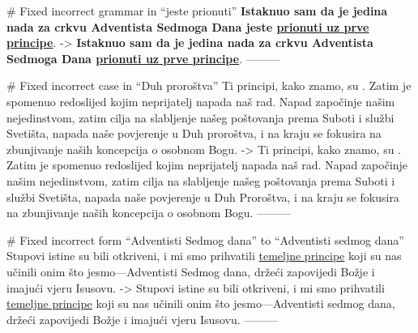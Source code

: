 # Fixed incorrect grammar in “jeste prionuti”
\textbf{Istaknuo sam da je jedina nada za crkvu Adventista Sedmoga Dana jeste \underline{prionuti uz prve principe}}. 
->
\textbf{Istaknuo sam da je jedina nada za crkvu Adventista Sedmoga Dana \underline{prionuti uz prve principe}}. 
---------

# Fixed incorrect case in “Duh proroštva”
Ti principi, kako znamo, su . Zatim je spomenuo redoslijed kojim neprijatelj napada naš rad. Napad započinje našim nejedinstvom, zatim cilja na slabljenje našeg poštovanja prema Suboti i službi Svetišta, napada naše povjerenje u Duh proroštva, i na kraju se fokusira na zbunjivanje naših koncepcija o osobnom Bogu.
->
Ti principi, kako znamo, su . Zatim je spomenuo redoslijed kojim neprijatelj napada naš rad. Napad započinje našim nejedinstvom, zatim cilja na slabljenje našeg poštovanja prema Suboti i službi Svetišta, napada naše povjerenje u Duh Proroštva, i na kraju se fokusira na zbunjivanje naših koncepcija o osobnom Bogu.
---------

# Fixed incorrect form “Adventisti Sedmog dana” to “Adventisti sedmog dana”
Stupovi istine su bili otkriveni, i mi smo prihvatili \underline{temeljne principe} koji su nas učinili onim što jesmo—Adventisti Sedmog dana, držeći zapovijedi Božje i imajući vjeru Isusovu.
->
Stupovi istine su bili otkriveni, i mi smo prihvatili \underline{temeljne principe} koji su nas učinili onim što jesmo—Adventisti sedmog dana, držeći zapovijedi Božje i imajući vjeru Isusovu.
---------